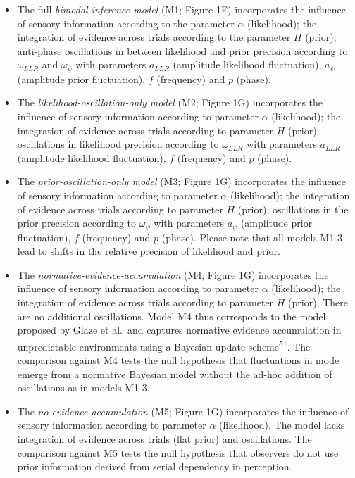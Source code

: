 \documentclass[
]{article}
\begin{document}
\begin{itemize}
\item
  The full \emph{bimodal inference model} (M1; Figure 1F) incorporates
  the influence of sensory information according to the parameter
  \(\alpha\) (likelihood); the integration of evidence across trials
  according to the parameter \(H\) (prior); anti-phase oscillations in
  between likelihood and prior precision according to \(\omega_{LLR}\)
  and \(\omega_{\psi}\) with parameters \(a_{LLR}\) (amplitude
  likelihood fluctuation), \(a_{\psi}\) (amplitude prior fluctuation),
  \(f\) (frequency) and \(p\) (phase).
\item
  The \emph{likelihood-oscillation-only model} (M2; Figure 1G)
  incorporates the influence of sensory information according to
  parameter \(\alpha\) (likelihood); the integration of evidence across
  trials according to parameter \(H\) (prior); oscillations in
  likelihood precision according to \(\omega_{LLR}\) with parameters
  \(a_{LLR}\) (amplitude likelihood fluctuation), \(f\) (frequency) and
  \(p\) (phase).
\item
  The \emph{prior-oscillation-only model} (M3; Figure 1G) incorporates
  the influence of sensory information according to parameter \(\alpha\)
  (likelihood); the integration of evidence across trials according to
  parameter \(H\) (prior); oscillations in the prior precision according
  to \(\omega_{\psi}\) with parameters \(a_{\psi}\) (amplitude prior
  fluctuation), \(f\) (frequency) and \(p\) (phase). Please note that
  all models M1-3 lead to shifts in the relative precision of likelihood
  and prior.
\item
  The \emph{normative-evidence-accumulation} (M4; Figure 1G)
  incorporates the influence of sensory information according to
  parameter \(\alpha\) (likelihood); the integration of evidence across
  trials according to parameter \(H\) (prior), There are no additional
  oscillations. Model M4 thus corresponds to the model proposed by Glaze
  et al.~and captures normative evidence accumulation in unpredictable
  environments using a Bayesian update scheme\textsuperscript{51}. The
  comparison against M4 tests the null hypothesis that fluctuations in
  mode emerge from a normative Bayesian model without the ad-hoc
  addition of oscillations as in models M1-3.
\item
  The \emph{no-evidence-accumulation} (M5; Figure 1G) incorporates the
  influence of sensory information according to parameter \(\alpha\)
  (likelihood). The model lacks integration of evidence across trials
  (flat prior) and oscillations. The comparison against M5 tests the
  null hypothesis that observers do not use prior information derived
  from serial dependency in perception.
\end{itemize}
\end{document}

